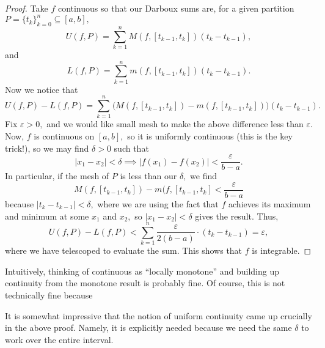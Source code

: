 \begin{proof}
	Take $f$ continuous so that our Darboux sums are, for a given partition $P=\{t_k\}_{k=0}^n\subseteq[a,b],$
	\[U(f,P)=\sum_{k=1}^nM(f,[t_{k-1},t_k])(t_k-t_{k-1}),\]
	and
	\[L(f,P)=\sum_{k=1}^nm(f,[t_{k-1},t_k])(t_k-t_{k-1}).\]
	Now we notice that
	\[U(f,P)-L(f,P)=\sum_{k=1}^n\big(M(f,[t_{k-1},t_k])-m(f,[t_{k-1},t_k])\big)(t_k-t_{k-1}).\]
	Fix $\varepsilon>0,$ and we would like small mesh to make the above difference less than $\varepsilon.$ Now, $f$ is continuous on $[a,b],$ so it is uniformly continuous (this is the key trick!), so we may find $\delta>0$ such that
	\[|x_1-x_2|<\delta\implies|f(x_1)-f(x_2)|<\frac{\varepsilon}{b-a}.\]
	In particular, if the mesh of $P$ is less than our $\delta,$ we find
	\[M(f,[t_{k-1},t_k])-m(f,[t_{k-1},t_k]<\frac{\varepsilon}{b-a}\]
	because $|t_k-t_{k-1}|<\delta,$ where we are using the fact that $f$ achieves its maximum and minimum at some $x_1$ and $x_2,$ so $|x_1-x_2|<\delta$ gives the result. Thus,
	\[U(f,P)-L(f,P)<\sum_{k=1}^n\frac{\varepsilon}{2(b-a)}\cdot(t_k-t_{k-1})=\varepsilon,\]
	where we have telescoped to evaluate the sum. This shows that $f$ is integrable.
\end{proof}
\begin{remark}
	Intuitively, thinking of continuous as ``locally monotone'' and building up continuity from the monotone result is probably fine. Of course, this is not technically fine because 
\end{remark}
\begin{remark}
	It is somewhat impressive that the notion of uniform continuity came up crucially in the above proof. Namely, it is explicitly needed because we need the same $\delta$ to work over the entire interval.
\end{remark}

